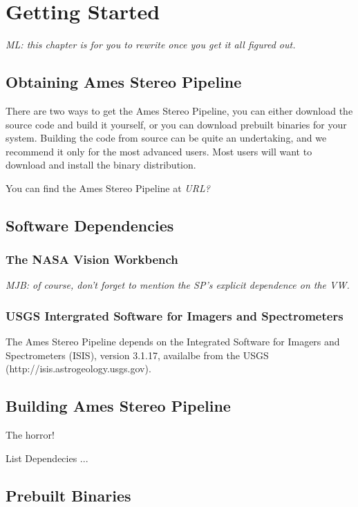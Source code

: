 \chapter{Getting Started}

\emph{ML: this chapter is for you to rewrite once you get it all figured out.}

\section{Obtaining Ames Stereo Pipeline}

There are two ways to get the Ames Stereo Pipeline, you can either
download the source code and build it yourself, or you can download
prebuilt binaries for your system.  Building the code from source can
be quite an undertaking, and we recommend it only for the most
advanced users.  Most users will want to download and install the
binary distribution.

You can find the Ames Stereo Pipeline at \emph{URL?}

\section{Software Dependencies}

\subsection{The NASA Vision Workbench}

\emph{MJB: of course, don't forget to mention the SP's explicit dependence on the VW.}

\subsection{USGS Intergrated Software for Imagers and Spectrometers}

The Ames Stereo Pipeline depends on the Integrated Software for Imagers and Spectrometers (ISIS), version 3.1.17, availalbe from the USGS (http://isis.astrogeology.usgs.gov).  

\section{Building Ames Stereo Pipeline}

The horror!

List Dependecies ...

\section{Prebuilt Binaries}

